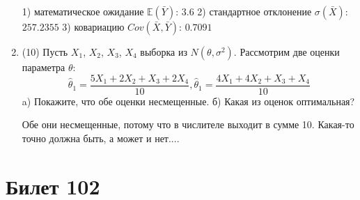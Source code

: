 \documentclass[a4paper,12pt]{article}
\begin{document}
\begin{enumerate}
1) математическое ожидание $\mathbb{E}(\bar Y)$: $3.6$ 
2) стандартное отклонение $\sigma(\bar X)$: $257.2355$
3) ковариацию $Cov(\bar X, \bar Y)$: $0.7091$


\item


(10) Пусть $X _{1}$, $X _{2}$, $X _{3}$, $X _{4}$ выборка из $N(\theta, \sigma ^{2})$. Рассмотрим две оценки параметра $\theta$:
\[\hat \theta _{1} = \frac{5X _{1} + 2X _{2} + X _{3} + 2X _{4}}{10}, \hat \theta _{1} = \frac{4X _{1} + 4X _{2} + X _{3} + X _{4}}{10}\]
a) Покажите, что обе оценки несмещенные.
б) Какая из оценок оптимальная?




Обе они несмещенные, потому что в числителе выходит в сумме 10.
Какая-то точно должна быть, а может и нет....



\end{enumerate}

\section{Билет 102}
\end{document}
